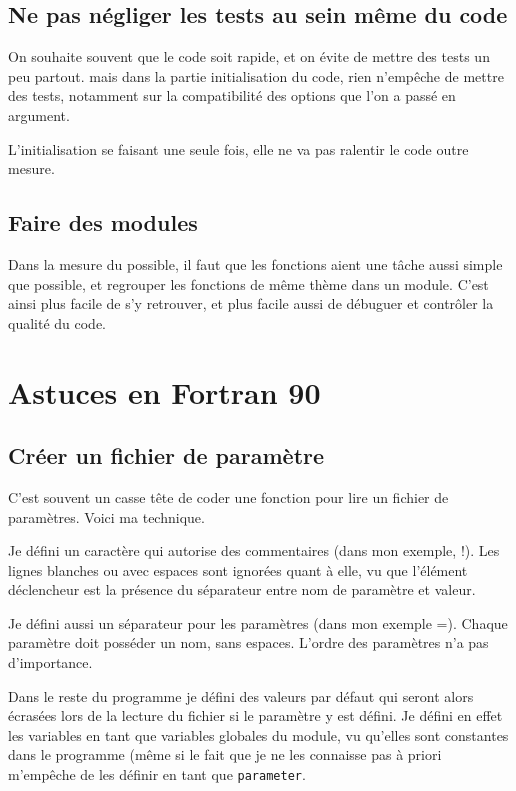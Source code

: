 \subsection{Ne pas négliger les tests au sein même du code}
On souhaite souvent que le code soit rapide, et on évite de mettre des tests un peu partout. mais dans la partie initialisation du code, rien n'empêche de mettre des tests, notamment sur la compatibilité des options que l'on a passé en argument. 

L'initialisation se faisant une seule fois, elle ne va pas ralentir le code outre mesure.

\subsection{Faire des modules}
Dans la mesure du possible, il faut que les fonctions aient une tâche aussi simple que possible, et regrouper les fonctions de même thème dans un module. C'est ainsi plus facile de s'y retrouver, et plus facile aussi de débuguer et contrôler la qualité du code. 

\section{Astuces en Fortran 90}

\subsection{Créer un fichier de paramètre}
C'est souvent un casse tête de coder une fonction pour lire un fichier de paramètres. Voici ma technique. 

Je défini un caractère qui autorise des commentaires (dans mon exemple, \og !\fg). Les lignes blanches ou avec espaces sont ignorées quant à elle, vu que l'élément déclencheur est la présence du séparateur entre nom de paramètre et valeur. 

Je défini aussi un séparateur pour les paramètres (dans mon exemple \og =\fg). Chaque paramètre doit posséder un nom, sans espaces. L'ordre des paramètres n'a pas d'importance. 

\begin{remarque}
Dans le reste du programme je défini des valeurs par défaut qui seront alors écrasées lors de la lecture du fichier si le paramètre y est défini. Je défini en effet les variables en tant que variables globales du module, vu qu'elles sont constantes dans le programme (même si le fait que je ne les connaisse pas à priori m'empêche de les définir en tant que \texttt{parameter}.
\end{remarque}


